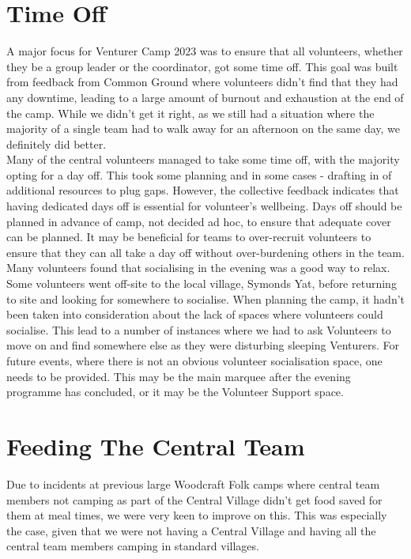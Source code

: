 \section{Time Off}
A major focus for Venturer Camp 2023 was to ensure that all volunteers, whether they be a group leader or the coordinator, got some time off. This goal was built from feedback from Common Ground where volunteers didn't find that they had any downtime, leading to a large amount of burnout and exhaustion at the end of the camp. While we didn't get it right, as we still had a situation where the majority of a single team had to walk away for an afternoon on the same day, we definitely did better.\\

Many of the central volunteers managed to take some time off, with the majority opting for a day off. This took some planning and in some cases - drafting in of additional resources to plug gaps. However, the collective feedback indicates that having dedicated days off is essential for volunteer's wellbeing. Days off should be planned in advance of camp, not decided ad hoc, to ensure that adequate cover can be planned. It may be beneficial for teams to over-recruit volunteers to ensure that they can all take a day off without over-burdening others in the team. \\

Many volunteers found that socialising in the evening was a good way to relax. Some volunteers went off-site to the local village, Symonds Yat, before returning to site and looking for somewhere to socialise. When planning the camp, it hadn't been taken into consideration about the lack of spaces where volunteers could socialise. This lead to a number of instances where we had to ask Volunteers to move on and find somewhere else as they were disturbing sleeping Venturers. For future events, where there is not an obvious volunteer socialisation space, one needs to be provided. This may be the main marquee after the evening programme has concluded, or it may be the Volunteer Support space. 

\section{Feeding The Central Team}
Due to incidents at previous large Woodcraft Folk camps where central team members not camping as part of the Central Village didn't get food saved for them at meal times, we were very keen to improve on this. This was especially the case, given that we were not having a Central Village and having all the central team members camping in standard villages.\\

